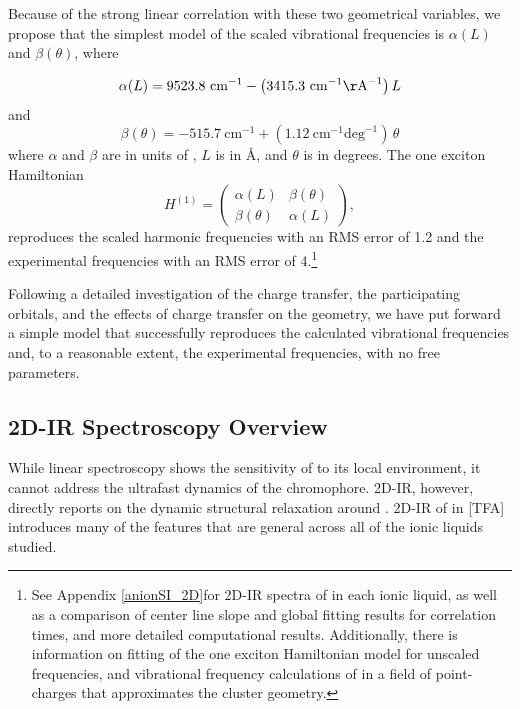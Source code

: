 Because of the strong linear correlation with these two geometrical variables,  we propose that the simplest model of the scaled vibrational frequencies is $\alpha(L)$ and $\beta(\theta)$, where

\begin{equation}
\alpha(L) = 9523.8~\mathrm{cm}^{-1} - \left(3415.3~\mathrm{cm}^{-1} \mathrm{\AA}^{-1}\right) L %
\end{equation}
and
\begin{equation}
\beta(\theta) = -515.7~\mathrm{cm}^{-1} + \left(1.12~\mathrm{cm}^{-1}\mathrm{deg}^{-1}\right)\, \theta  %
\end{equation}
where $\alpha$ and $\beta$ are in units of \si{\wavenumber}, $L$ is in \si{\angstrom}, and $\theta$ is in degrees. The one exciton Hamiltonian
\begin{equation}
  H^{(1)} =
  \begin{pmatrix}
    \alpha(L) & \beta(\theta)\\
    \beta(\theta) & \alpha(L)
  \end{pmatrix},
\end{equation}
reproduces the scaled harmonic frequencies with an RMS error of \SI{1.2}{\wavenumber} and the experimental frequencies with an RMS error of \SI{4}{\wavenumber}.\footnote{See Appendix \ref{anionSI_2D}for 2D-IR spectra of  in each ionic liquid, as well as a comparison of center line slope and global fitting results for correlation times, and more detailed computational results. Additionally, there is information on fitting of the one exciton Hamiltonian model for unscaled frequencies, and vibrational frequency calculations of  in a field of point-charges that approximates the cluster geometry.}

Following a detailed investigation of the charge transfer, the participating orbitals, and the effects of charge transfer on the  geometry, we have put forward a simple model that successfully reproduces the calculated vibrational frequencies and, to a reasonable extent, the experimental frequencies, with no free parameters.
 
\subsection{2D-IR Spectroscopy Overview}
\label{sec:anions_2DIR}
While linear spectroscopy shows the sensitivity of  to its local environment, it cannot address the ultrafast dynamics of the chromophore. 2D-IR, however, directly reports on the dynamic structural relaxation around . 2D-IR of  in \ce{[Im_{4,1}]}[TFA] introduces many of the features that are general across all of the ionic liquids studied.

